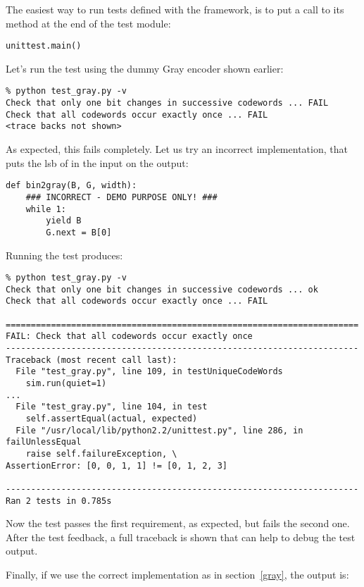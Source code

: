The easiest way to run tests defined with the 
framework, is to put a call to its  method at the end of
the test module:

\begin{verbatim}
unittest.main()
\end{verbatim}

Let's run the test using the dummy Gray encoder shown earlier:

\begin{verbatim}
% python test_gray.py -v
Check that only one bit changes in successive codewords ... FAIL
Check that all codewords occur exactly once ... FAIL
<trace backs not shown>
\end{verbatim}

As expected, this fails completely. Let us try an incorrect
implementation, that puts the lsb of in the input on the output:

\begin{verbatim}
def bin2gray(B, G, width):
    ### INCORRECT - DEMO PURPOSE ONLY! ###
    while 1:
        yield B
        G.next = B[0]
\end{verbatim}


Running the test produces:

\begin{verbatim}
% python test_gray.py -v
Check that only one bit changes in successive codewords ... ok
Check that all codewords occur exactly once ... FAIL

======================================================================
FAIL: Check that all codewords occur exactly once
----------------------------------------------------------------------
Traceback (most recent call last):
  File "test_gray.py", line 109, in testUniqueCodeWords
    sim.run(quiet=1)
...
  File "test_gray.py", line 104, in test
    self.assertEqual(actual, expected)
  File "/usr/local/lib/python2.2/unittest.py", line 286, in failUnlessEqual
    raise self.failureException, \
AssertionError: [0, 0, 1, 1] != [0, 1, 2, 3]

----------------------------------------------------------------------
Ran 2 tests in 0.785s
\end{verbatim}

Now the test passes the first requirement, as expected, but fails the
second one. After the test feedback, a full traceback is shown that
can help to debug the test output.

Finally, if we use the correct implementation as in
section~\ref{gray}, the output is:

